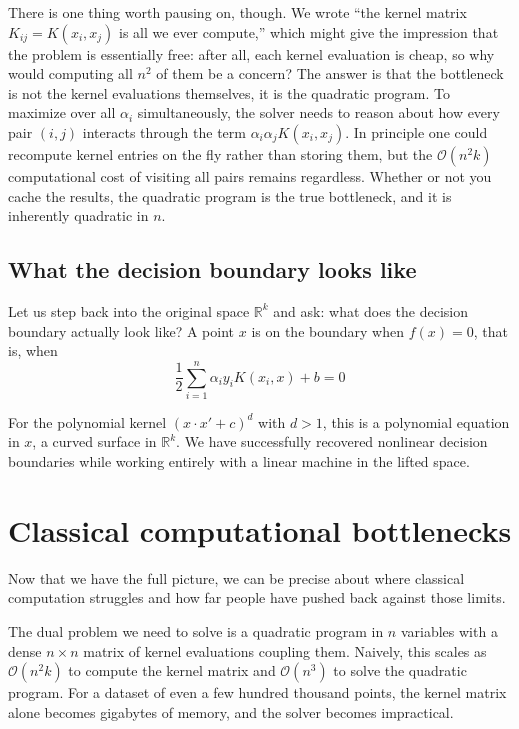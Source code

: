 \documentclass[12pt,a4paper]{article}
\begin{document}
There is one thing worth pausing on, though. We wrote ``the kernel matrix
$K_{ij} = K(x_i, x_j)$ is all we ever compute,'' which might give the
impression that the problem is essentially free: after all, each kernel
evaluation is cheap, so why would computing all $n^2$ of them be a
concern? The answer is that the bottleneck is not the kernel evaluations
themselves, it is the quadratic program. To maximize over all $\alpha_i$
simultaneously, the solver needs to reason about how every pair $(i, j)$
interacts through the term $\alpha_i \alpha_j K(x_i, x_j)$. In principle
one could recompute kernel entries on the fly rather than storing them,
but the $\mathcal{O}(n^2 k)$ computational cost of visiting all pairs
remains regardless. Whether or not you cache the results, the quadratic
program is the true bottleneck, and it is inherently quadratic in $n$.

\subsection{What the decision boundary looks like}

Let us step back into the original space $\mathbb{R}^k$ and ask: what does
the decision boundary actually look like? A point $x$ is on the boundary
when $f(x) = 0$, that is, when
\[
\frac{1}{2}\sum_{i=1}^n \alpha_i y_i K(x_i, x) + b = 0
\]

For the polynomial kernel $(x \cdot x' + c)^d$ with $d > 1$, this is a
polynomial equation in $x$, a curved surface in $\mathbb{R}^k$. We have
successfully recovered nonlinear decision boundaries while working entirely
with a linear machine in the lifted space.

\newpage

\section{Classical computational bottlenecks}

Now that we have the full picture, we can be precise about where classical
computation struggles and how far people have pushed back against those
limits.

The dual problem we need to solve is a quadratic program in $n$ variables
with a dense $n \times n$ matrix of kernel evaluations coupling them.
Naively, this scales as $\mathcal{O}(n^2 k)$ to compute the kernel matrix
and $\mathcal{O}(n^3)$ to solve the quadratic program. For a dataset of
even a few hundred thousand points, the kernel matrix alone becomes
gigabytes of memory, and the solver becomes impractical.
\end{document}

